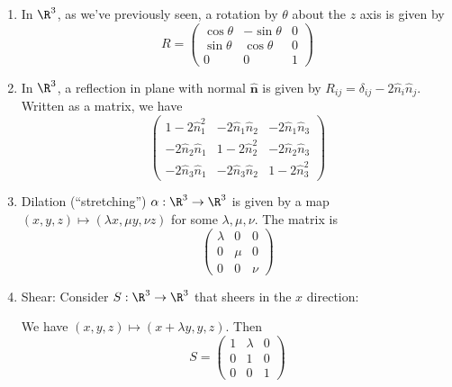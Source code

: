 \documentclass[a4paper]{article}
\begin{document}
\begin{enumerate}
  \item In $\R^3$, as we've previously seen, a rotation by $\theta$ about the $z$ axis is given by
    \[
      R = \begin{pmatrix}
        \cos\theta & -\sin\theta & 0 \\
        \sin\theta & \cos\theta & 0 \\
        0 & 0 & 1
      \end{pmatrix}
    \]
  \item In $\R^3$, a reflection in plane with normal $\hat{\mathbf{n}}$ is given by $R_{ij} = \delta_{ij} - 2\hat n_i\hat n_j$. Written as a matrix, we have
    \[
      \begin{pmatrix}
        1 - 2\hat n_1^2 & -2\hat n_1\hat n_2 & -2\hat n_1\hat n_3\\
        -2\hat n_2\hat n_1 & 1 - 2\hat n_2^2 & -2\hat n_2\hat n_3\\
        -2\hat n_3\hat n_1 & -2\hat n_3\hat n_2 & 1 - 2\hat n_3^2
      \end{pmatrix}
    \]
  \item Dilation (``stretching'') $\alpha: \R^3 \to \R^3$ is given by a map $(x, y, z)\mapsto (\lambda x, \mu y, \nu z)$ for some $\lambda, \mu, \nu$. The matrix is
    \[
      \begin{pmatrix}
        \lambda & 0 & 0\\
        0 & \mu & 0\\
        0 & 0 & \nu
      \end{pmatrix}
    \]
  \item Shear: Consider $S:\R^3 \to \R^3$ that sheers in the $x$ direction:
    \begin{center}
    \end{center}
    We have $(x, y, z)\mapsto (x + \lambda y, y, z)$. Then
    \[
      S =
      \begin{pmatrix}
        1 & \lambda & 0\\
        0 & 1 & 0\\
        0 & 0 & 1
      \end{pmatrix}
    \]
\end{enumerate}
\end{document}
